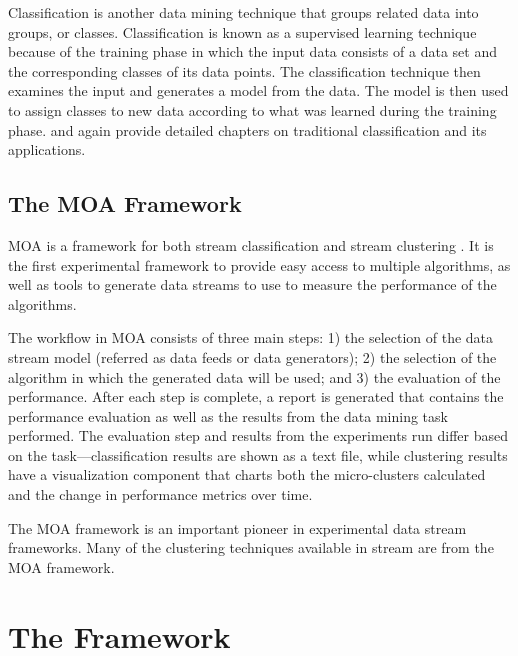 \documentclass[nojss]{jss}
\begin{document}
Classification is another data mining technique that groups related data into groups, or classes. Classification is known as a supervised learning technique because of the training phase in which the input data consists of a data set and the corresponding classes of its data points. The classification technique then examines the input and generates a model from the data. The model is then used to assign classes to new data according to what was learned during the training phase. \citep{stream:Dunham:2002} and \citep{stream:Tan+Steinbach+Kumar:2006} again provide detailed chapters on traditional classification and its applications.

\subsection{The MOA Framework}
\label{sec:background:moa}

MOA is a framework for both stream classification and stream clustering \citep{stream:Bifet+Holmes+Kirkby+Pfahringer:2010}. It is the first experimental framework to provide easy access to multiple algorithms, as well as tools to generate data streams to use to measure the performance of the algorithms. 


The workflow in MOA consists of three main steps: 1) the selection of the data stream model (referred as data feeds or data generators); 2) the selection of the algorithm in which the generated data will be used; and 3) the evaluation of the performance. After each step is complete, a report is generated that contains the performance evaluation as well as the results from the data mining task performed. The evaluation step and results from the experiments run differ based on the task—classification results are shown as a text file, while clustering results have a visualization component that charts both the micro-clusters calculated and the change in performance metrics over time.


The MOA framework is an important pioneer in experimental data stream frameworks. Many of the clustering techniques available in stream are from the MOA framework.

\section{The  Framework}
\label{sec:design}
\end{document}

